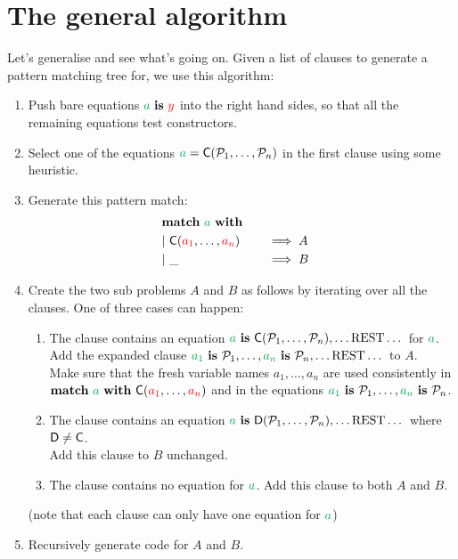 \documentclass[a4paper, 11pt]{article}
\theoremstyle{definition}
\begin{document}
\section{The general algorithm}

Let's generalise and see what's going on. Given a list of clauses to generate a pattern matching tree for, we use this algorithm:

\begin{enumerate}
  \item Push bare equations $\ba \is \fvar y$ into the right hand sides, so that all the remaining equations test constructors.
  \item Select one of the equations $\ba = \C(\pat_1, \dots, \pat_n)$ in the first clause using some heuristic.
  \item Generate this pattern match:
  \begin{alignat*}{4}
    \matchwith{\ba} \\
    \clause{\C(\fvar{a_1}, \dots, \fvar{a_n})}{A} \\
    \clause{\_}{B}
  \end{alignat*}
  \item Create the two sub problems $A$ and $B$ as follows by iterating over all the clauses. One of three cases can happen:
  \begin{enumerate}
    \item The clause contains an equation $\ba \is \C(\pat_1, \dots, \pat_n), \dots \text{REST} \dots$ for $\ba$. \\
          Add the expanded clause $\bvar{a_1} \is \pat_1, \dots, \bvar{a_n} \is \pat_n, \dots \text{REST} \dots$ to $A$. \\
          Make sure that the fresh variable names $a_1,\dots,a_n$ are used consistently in \\
          $\mathbf{match}\ \ba\ \mathbf{with}\ \C(\fvar{a_1}, \dots, \fvar{a_n})$ and in the equations $\bvar{a_1} \is \pat_1, \dots, \bvar{a_n} \is \pat_n$.
    \item The clause contains an equation $\ba \is \mathsf{D}(\pat_1, \dots, \pat_n), \dots \text{REST} \dots$ where $\mathsf{D} \neq \mathsf{\textcolor{black}{C}}$. \\
          Add this clause to $B$ unchanged.
    \item The clause contains no equation for $\ba$. Add this clause to both $A$ and $B$.
  \end{enumerate}
  (note that each clause can only have one equation for $\ba$)
  \item Recursively generate code for $A$ and $B$.
\end{enumerate}
\end{document}
